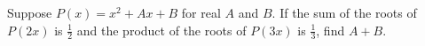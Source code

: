 Suppose $P(x)=x^{2}+Ax+B$ for real $A$ and $B$. If the sum of the roots of $P(2x)$ is $\frac{1}{2}$ and the product of the roots of $P(3x)$ is $\frac{1}{3}$, find $A+B$.